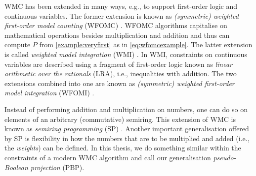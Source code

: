 

WMC has been extended in many ways, e.g., to support first-order logic and continuous variables. The former extension is known as \emph{(symmetric) weighted first-order model counting} (WFOMC) \citep{DBLP:conf/ijcai/BroeckTMDR11}. WFOMC algorithms capitalise on mathematical operations besides multiplication and addition and thus can compute $P$ from \cref{example:veryfirst} as in \cref{eq:wfomcexample}. The latter extension is called \emph{weighted model integration} (WMI) \citep{DBLP:conf/ijcai/BellePB15}. In WMI, constraints on continuous variables are described using a fragment of first-order logic known as \emph{linear arithmetic over the rationals} (LRA), i.e., inequalities with addition. The two extensions combined into one are known as \emph{(symmetric) weighted first-order model integration} (WFOMI) \citep{DBLP:conf/uai/FeldsteinB21}.

Instead of performing addition and multiplication on numbers, one can do so on elements of an arbitrary (commutative) semiring. This extension of WMC is known as \emph{semiring programming} (SP) \citep{DBLP:journals/ijar/BelleR20}. Another important generalisation offered by SP is flexibility in how the numbers that are to be multiplied and added (i.e., the \emph{weights}) can be defined. In this thesis, we do something similar within the constraints of a modern WMC algorithm and call our generalisation \emph{pseudo-Boolean projection} (PBP).

